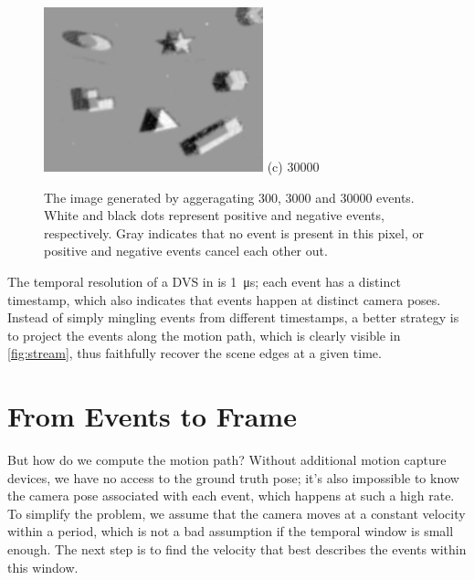 \begin{figure}[h]
\begin{minipage}[t]{0.3\textwidth}
    \centering \includegraphics[width = \textwidth]{images/30000.jpg}
    (c) \num{30000}
  \end{minipage}
  \caption{The image generated by aggeragating \num{300}, \num{3000}
    and \num{30000} events. White and black dots represent positive
    and negative events, respectively. Gray indicates that no event is
    present in this pixel, or positive and negative events cancel each
    other out.}
  \label{fig:window_size_3}
\end{figure}

The temporal resolution of a DVS in \citep{brandli2014240} is
\SI{1}{\micro s}; each event has a distinct timestamp, which also
indicates that events happen at distinct camera poses. Instead of
simply mingling events from different timestamps, a better strategy is
to project the events along the motion path, which is clearly visible
in \cref{fig:stream}, thus faithfully recover the scene edges at a
given time.


\section{From Events to Frame}
\label{sec:event_warp}
But how do we compute the motion path? Without additional motion
capture devices, we have no access to the ground truth pose; it's also
impossible to know the camera pose associated with each event, which
happens at such a high rate. To simplify the problem, we assume that
the camera moves at a constant velocity within a period, which is not
a bad assumption if the temporal window is small enough. The next step
is to find the velocity that best describes the events within this
window.


